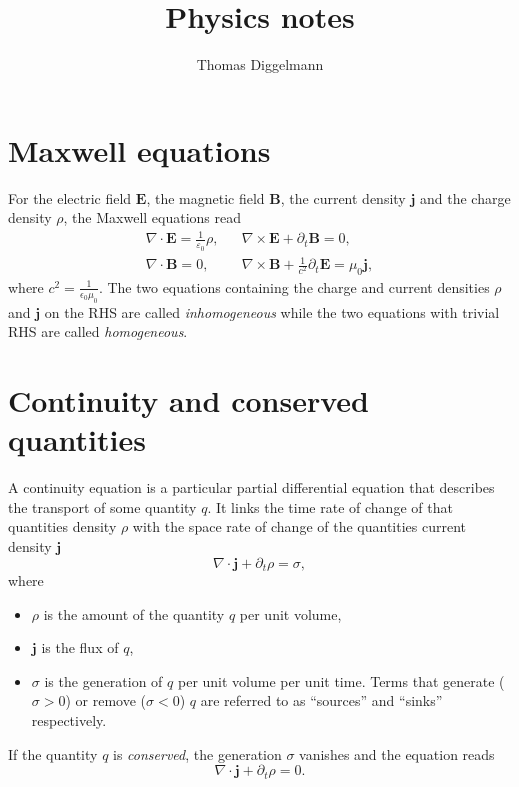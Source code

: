 \documentclass[a4paper, 11pt]{scrartcl}
\title{Physics notes}
\author{Thomas Diggelmann}
\begin{document}
\maketitle

\section*{Maxwell equations}

For the electric field $\textbf{E}$, the magnetic field $\textbf{B}$, the current density $\mathbf{j}$ and the charge density $\rho$, the Maxwell equations read
%
\begin{align*}
  \nabla\cdot\mathbf{E} = \frac{1}{\varepsilon_0}\rho, && \nabla\times\mathbf{E}+\partial_t\mathbf{B}=0, \\
  \nabla\cdot\mathbf{B} = 0,
  && \nabla\times\mathbf{B}+\frac{1}{c^2}\partial_t\mathbf{E}=\mu_0\mathbf{j},
\end{align*}
%
where $c^2 = \frac{1}{\epsilon_0\mu_0}$. The two equations containing the charge and current densities $\rho$ and $\mathbf{j}$ on the RHS are called \emph{inhomogeneous} while the two equations with trivial RHS are called \emph{homogeneous}.

\section*{Continuity and conserved quantities}

A continuity equation is a particular partial differential equation that describes the transport of some quantity $q$. It links the time rate of change of that quantities density $\rho$ with the space rate of change of the quantities current density $\mathbf{j}$
\begin{equation*}
    \nabla\cdot\mathbf{j}+\partial_t\rho=\sigma,
\end{equation*}
where
\begin{itemize}
  \item $\rho$ is the amount of the quantity $q$ per unit volume,
  \item $\mathbf{j}$ is the flux of $q$,
  \item $\sigma$ is the generation of $q$ per unit volume per unit time. Terms that generate ($\sigma > 0$) or remove ($\sigma < 0$) $q$ are referred to as ``sources'' and ``sinks'' respectively.
\end{itemize}
%
If the quantity $q$ is \emph{conserved}, the generation $\sigma$ vanishes and the equation reads
\begin{equation*}
    \nabla\cdot\mathbf{j}+\partial_t\rho=0.
\end{equation*}
\end{document}

